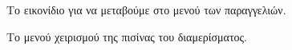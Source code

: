 \documentclass[a4paper,titlepage,twoside,12pt,leqno]{article}
\begin{document}
\begin{figure}
\begin{center}
\caption{Το εικονίδιο για να μεταβούμε στο μενού των παραγγελιών.}
\label{fig:icon:pool}
\end{center}
\end{figure}

\begin{figure}
\begin{center}
\caption{Το μενού χειρισμού της πισίνας του διαμερίσματος.}
\label{fig:menu:pool}
\end{center}
\end{figure}
\end{document}
